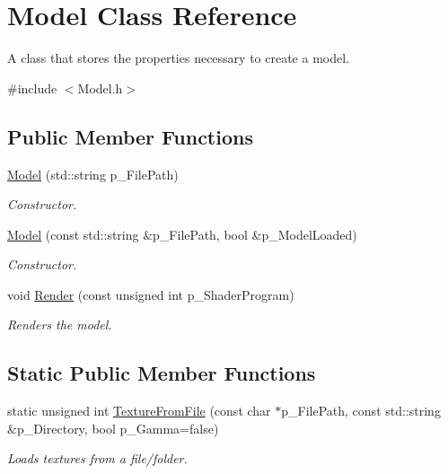 \hypertarget{class_model}{}\section{Model Class Reference}
\label{class_model}


A class that stores the properties necessary to create a model.  




{\ttfamily \#include $<$Model.\+h$>$}

\subsection*{Public Member Functions}
\begin{DoxyCompactItemize}
\item 
\mbox{\hyperlink{class_model_a1803bcfb4df005e3fc0e4cc9803e862c}{Model}} (std\+::string p\+\_\+\+File\+Path)
\begin{DoxyCompactList}\small\item\em Constructor. \end{DoxyCompactList}\item 
\mbox{\hyperlink{class_model_a27483109877a1835b5932074a78edb95}{Model}} (const std\+::string \&p\+\_\+\+File\+Path, bool \&p\+\_\+\+Model\+Loaded)
\begin{DoxyCompactList}\small\item\em Constructor. \end{DoxyCompactList}\item 
void \mbox{\hyperlink{class_model_ab5283b9f5bbd72e86fe79f5ad9b5bd81}{Render}} (const unsigned int p\+\_\+\+Shader\+Program)
\begin{DoxyCompactList}\small\item\em Renders the model. \end{DoxyCompactList}\end{DoxyCompactItemize}
\subsection*{Static Public Member Functions}
\begin{DoxyCompactItemize}
\item 
static unsigned int \mbox{\hyperlink{class_model_af13273ddd9a34c09beba7f210bf978af}{Texture\+From\+File}} (const char $\ast$p\+\_\+\+File\+Path, const std\+::string \&p\+\_\+\+Directory, bool p\+\_\+\+Gamma=false)
\begin{DoxyCompactList}\small\item\em Loads textures from a file/folder. \end{DoxyCompactList}\end{DoxyCompactItemize}



